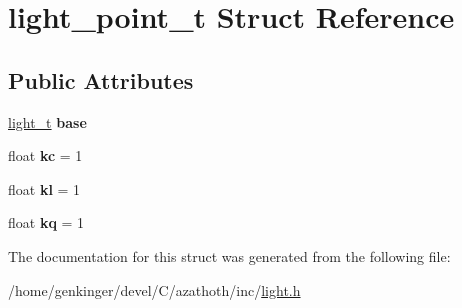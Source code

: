 \hypertarget{structlight__point__t}{}\section{light\+\_\+point\+\_\+t Struct Reference}
\label{structlight__point__t}
\subsection*{Public Attributes}
\begin{DoxyCompactItemize}
\item 
\mbox{\label{structlight__point__t_a1b2cc597b8e0201633054d2357eae495}} 
\mbox{\hyperlink{structlight__t}{light\+\_\+t}} {\bfseries base}
\item 
\mbox{\label{structlight__point__t_a25a1b8219e83275732cb8eac99153123}} 
float {\bfseries kc} = 1
\item 
\mbox{\label{structlight__point__t_a157789e0ae41bb646901107713d5f776}} 
float {\bfseries kl} = 1
\item 
\mbox{\label{structlight__point__t_a65174e65ead6788b65702300431f2c38}} 
float {\bfseries kq} = 1
\end{DoxyCompactItemize}


The documentation for this struct was generated from the following file\+:\begin{DoxyCompactItemize}
\item 
/home/genkinger/devel/\+C/azathoth/inc/\mbox{\hyperlink{light_8h}{light.\+h}}\end{DoxyCompactItemize}
